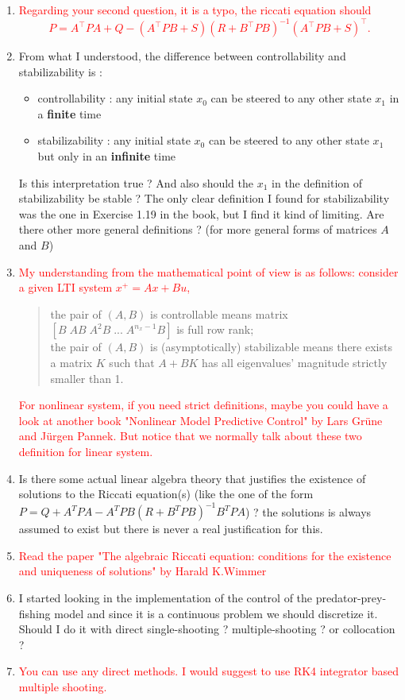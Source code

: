 \documentclass[12pt]{article}
\numberwithin{theorem}{section} %
\theoremstyle{definition}
\theoremstyle{remark}
\begin{document}
\begin{enumerate}
	\item[] \textcolor{red}{Regarding your second question, it is a typo, the riccati equation should 
	\[
	P = A^\top P A +Q - (A^\top PB + S)(R+B^\top P B)^{-1}(A^\top PB + S)^\top.
	\]}
	\item From what I understood, the difference between controllability and stabilizability is :
	\begin{itemize}[label=\textbullet]
		\item controllability : any initial state $x_0$ can be steered to any other state $x_1$ in a \textbf{finite} time
		\item stabilizability : any initial state $x_0$ can be steered to any other state $x_1$ but only in an \textbf{infinite} time
	\end{itemize}
	Is this interpretation true ?
	And also should the $x_1$ in the definition of stabilizability be stable ?
	The only clear definition I found for stabilizability was the one in Exercise 1.19 in the book, but I find it kind of limiting. Are there other more general definitions ? (for more general forms of matrices $A$ and $B$)
    \item[] \textcolor{red}{My understanding from the mathematical point of view is as follows: consider a given LTI system $x^+ = A x+ Bu$, 
    \begin{quote}
        the pair of $(A,B)$ is controllable means matrix $[B\;AB\;A^2B\;...\;A^{n_x-1}B]$ is full row rank;\\
        the pair of $(A,B)$ is (asymptotically) stabilizable means there exists a matrix $K$ such that $A+BK$ has all eigenvalues' magnitude strictly smaller than 1.
    \end{quote}
    For nonlinear system, if you need strict definitions, maybe you could have a look at another book "Nonlinear Model Predictive Control" by Lars Grüne and Jürgen Pannek. But notice that we normally talk about these two definition for linear system.}
    
	\item Is there some actual linear algebra theory that justifies the existence of solutions to the Riccati equation(s) (like the one of the form $P=Q+A^TPA-A^TPB(R+B^TPB)^{-1}B^TPA$) ? the solutions is always assumed to exist but there is never a real justification for this.
    \item[] \textcolor{red}{Read the paper "The algebraic Riccati equation: conditions for the existence and uniqueness of solutions" by Harald K.Wimmer}
	\item I started looking in the implementation of the control of the predator-prey-fishing model and since it is a continuous problem we should discretize it.
	Should I do it with direct single-shooting ? multiple-shooting ? or collocation ?
	\item[] \textcolor{red}{You can use any direct methods. I would suggest to use RK4 integrator based multiple shooting.}
\end{enumerate}
\end{document}
